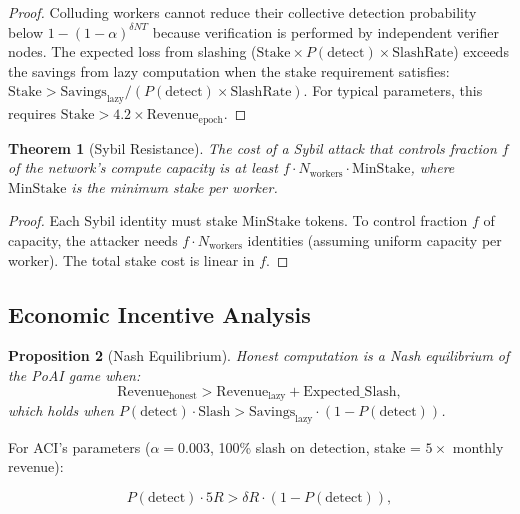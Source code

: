 \documentclass[11pt,twocolumn]{article}
\newtheorem{theorem}{Theorem}
\newtheorem{proposition}[theorem]{Proposition}
\begin{document}
\begin{proof}
Colluding workers cannot reduce their collective detection probability below $1 - (1-\alpha)^{\delta N T}$ because verification is performed by independent verifier nodes. The expected loss from slashing ($\text{Stake} \times P(\text{detect}) \times \text{SlashRate}$) exceeds the savings from lazy computation when the stake requirement satisfies:
$\text{Stake} > \text{Savings}_{\text{lazy}} / (P(\text{detect}) \times \text{SlashRate})$.
For typical parameters, this requires $\text{Stake} > 4.2 \times \text{Revenue}_{\text{epoch}}$.
\end{proof}

\begin{theorem}[Sybil Resistance]
The cost of a Sybil attack that controls fraction $f$ of the network's compute capacity is at least $f \cdot N_{\text{workers}} \cdot \text{MinStake}$, where $\text{MinStake}$ is the minimum stake per worker.
\end{theorem}

\begin{proof}
Each Sybil identity must stake $\text{MinStake}$ tokens. To control fraction $f$ of capacity, the attacker needs $f \cdot N_{\text{workers}}$ identities (assuming uniform capacity per worker). The total stake cost is linear in $f$.
\end{proof}

\subsection{Economic Incentive Analysis}

\begin{proposition}[Nash Equilibrium]
Honest computation is a Nash equilibrium of the PoAI game when:
\begin{equation}
\text{Revenue}_{\text{honest}} > \text{Revenue}_{\text{lazy}} + \text{Expected\_Slash},
\end{equation}
which holds when $P(\text{detect}) \cdot \text{Slash} > \text{Savings}_{\text{lazy}} \cdot (1 - P(\text{detect}))$.
\end{proposition}

For ACI's parameters ($\alpha = 0.003$, 100\% slash on detection, stake = $5\times$ monthly revenue):

\begin{equation}
P(\text{detect}) \cdot 5R > \delta R \cdot (1 - P(\text{detect})),
\end{equation}
\end{document}
